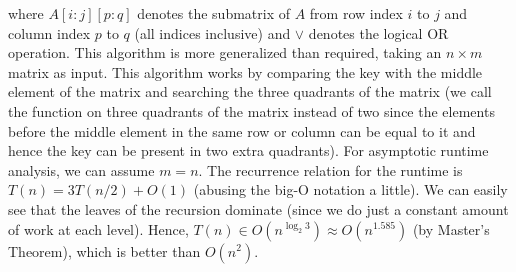 \documentclass{article}
\begin{document}
  where $A[i:j][p:q]$ denotes the submatrix of $A$ from row index $i$ to $j$ and column index $p$ to $q$ (all indices inclusive) and $\lor$ denotes the logical OR operation.
  This algorithm is more generalized than required, taking an $n \times m$ matrix as input.
  This algorithm works by comparing the key with the middle element of the matrix and searching the three quadrants of the matrix (we call the function on three quadrants of the matrix instead of two since the elements before the middle element in the same row or column can be equal to it and hence the key can be present in two extra quadrants).
  For asymptotic runtime analysis, we can assume $m = n$.
  The recurrence relation for the runtime is $T(n) = 3T(n/2) + O(1)$ (abusing the big-O notation a little).
  We can easily see that the leaves of the recursion dominate (since we do just a constant amount of work at each level).
  Hence, $T(n) \in O(n^{\log_{2}{3}}) \approx O(n^{1.585})$ (by Master's Theorem), which is better than $O(n^2)$.
\end{document}

